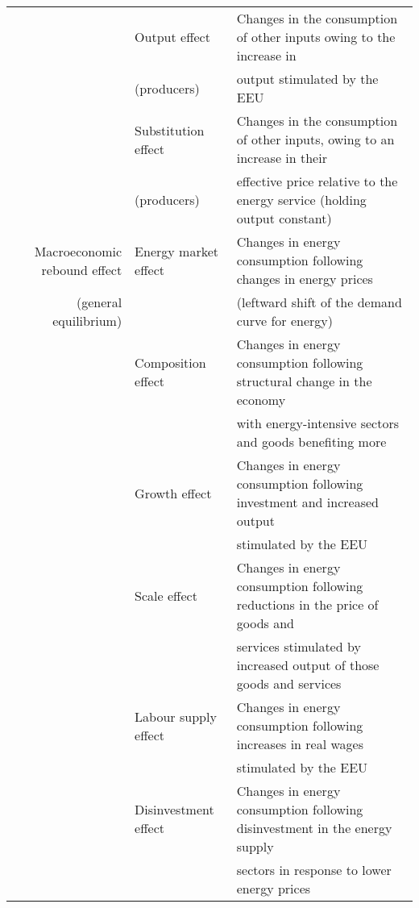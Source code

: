 \begin{landscape}
\begin{table}
\begin{center}
\begin{tabular}{ r l l }
                        \cmidrule{2-3}
                        & Output effect       & Changes in the consumption of other inputs owing to the increase in \\
                        & (producers)         & output stimulated by the EEU \\
                        \cmidrule{2-3}
                        & Substitution effect & Changes in the consumption of other inputs, owing to an increase in their \\
                        & (producers)         & effective price relative to the energy service (holding output constant) \\
\midrule
Macroeconomic rebound effect & Energy market effect & Changes in energy consumption following changes in energy prices \\
(general equilibrium)        &                      & (leftward shift of the demand curve for energy) \\
                             \cmidrule{2-3}
                             & Composition effect   & Changes in energy consumption following structural change in the economy \\
                             &                      & with energy-intensive sectors and goods benefiting more \\
                             \cmidrule{2-3}
                             & Growth effect        & Changes in energy consumption following investment and increased output \\
                             &                      & stimulated by the EEU \\
                             \cmidrule{2-3}
                             & Scale effect         & Changes in energy consumption following reductions in the price of goods and \\
                             &                      & services stimulated by increased output of those goods and services \\
                             \cmidrule{2-3}
                             & Labour supply effect & Changes in energy consumption following increases in real wages \\
                             &                      & stimulated by the EEU \\
                             \cmidrule{2-3}
                             & Disinvestment effect & Changes in energy consumption following disinvestment in the energy supply \\
                             &                      & sectors in response to lower energy prices \\
\bottomrule
\end{tabular}
\end{center}
\end{table}
\end{landscape}